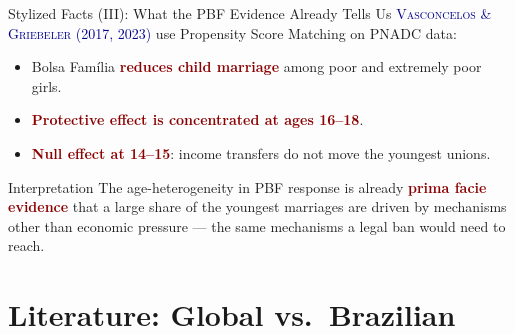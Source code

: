 \documentclass[aspectratio=169,10pt]{beamer}
\newcommand{\onecite}[1]{\textcolor{darkblue}{\textsc{#1}}}
\newcommand{\hl}[1]{\textcolor{darkred}{\textbf{#1}}}
\begin{document}
\begin{frame}{Stylized Facts (III): What the PBF Evidence Already Tells Us}
    \onecite{Vasconcelos \& Griebeler (2017, 2023)} use Propensity Score Matching on PNADC data:
    \begin{itemize}
        \item Bolsa Fam\'ilia \hl{reduces child marriage} among poor and extremely poor girls.
        \item \hl{Protective effect is concentrated at ages 16--18}.
        \item \hl{Null effect at 14--15}: income transfers do not move the youngest unions.
    \end{itemize}
    \vspace{0.3cm}
    \begin{alertblock}{Interpretation}
        The age-heterogeneity in PBF response is already \hl{prima facie evidence} that a large share of the youngest marriages are driven by mechanisms other than economic pressure --- the same mechanisms a legal ban would need to reach.
    \end{alertblock}
\end{frame}

\section{Literature: Global vs.\ Brazilian}
\end{document}
